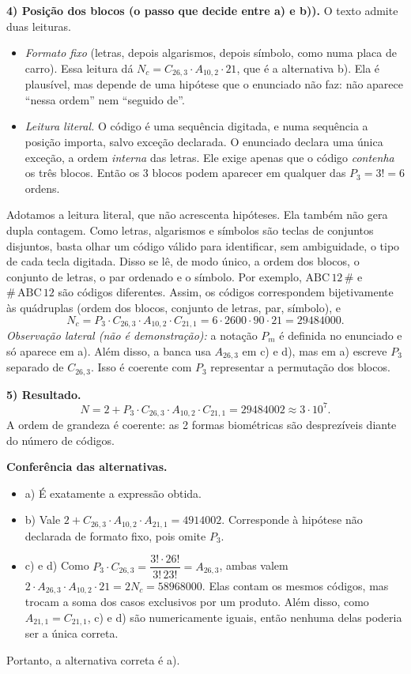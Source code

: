 \documentclass{article}%
\begin{document}
\textbf{4) Posição dos blocos (o passo que decide entre a) e b)).} O texto admite duas leituras.
\begin{itemize}
\item \emph{Formato fixo} (letras, depois algarismos, depois símbolo, como numa placa de carro). Essa leitura dá $N_c=C_{26,3}\cdot A_{10,2}\cdot 21$, que é a alternativa b). Ela é plausível, mas depende de uma hipótese que o enunciado não faz: não aparece ``nessa ordem'' nem ``seguido de''.
\item \emph{Leitura literal.} O código é uma sequência digitada, e numa sequência a posição importa, salvo exceção declarada. O enunciado declara uma única exceção, a ordem \emph{interna} das letras. Ele exige apenas que o código \emph{contenha} os três blocos. Então os 3 blocos podem aparecer em qualquer das $P_3=3!=6$ ordens.
\end{itemize}
Adotamos a leitura literal, que não acrescenta hipóteses. Ela também não gera dupla contagem. Como letras, algarismos e símbolos são teclas de conjuntos disjuntos, basta olhar um código válido para identificar, sem ambiguidade, o tipo de cada tecla digitada. Disso se lê, de modo único, a ordem dos blocos, o conjunto de letras, o par ordenado e o símbolo. Por exemplo, $\text{ABC}\,12\,\#$ e $\#\,\text{ABC}\,12$ são códigos diferentes. Assim, os códigos correspondem bijetivamente às quádruplas (ordem dos blocos, conjunto de letras, par, símbolo), e
\[
N_c=P_3\cdot C_{26,3}\cdot A_{10,2}\cdot C_{21,1}=6\cdot2600\cdot90\cdot21=29484000 .
\]
\emph{Observação lateral (não é demonstração):} a notação $P_m$ é definida no enunciado e só aparece em a). Além disso, a banca usa $A_{26,3}$ em c) e d), mas em a) escreve $P_3$ separado de $C_{26,3}$. Isso é coerente com $P_3$ representar a permutação dos blocos.

\textbf{5) Resultado.}
\[
N=2+P_3\cdot C_{26,3}\cdot A_{10,2}\cdot C_{21,1}=29484002\approx 3\cdot10^{7}.
\]
A ordem de grandeza é coerente: as 2 formas biométricas são desprezíveis diante do número de códigos.

\textbf{Conferência das alternativas.}
\begin{itemize}
\item a) É exatamente a expressão obtida.
\item b) Vale $2+C_{26,3}\cdot A_{10,2}\cdot A_{21,1}=4914002$. Corresponde à hipótese não declarada de formato fixo, pois omite $P_3$.
\item c) e d) Como $P_3\cdot C_{26,3}=\dfrac{3!\cdot 26!}{3!\,23!}=A_{26,3}$, ambas valem $2\cdot A_{26,3}\cdot A_{10,2}\cdot21=2N_c=58968000$. Elas contam os mesmos códigos, mas trocam a soma dos casos exclusivos por um produto. Além disso, como $A_{21,1}=C_{21,1}$, c) e d) são numericamente iguais, então nenhuma delas poderia ser a única correta.
\end{itemize}
Portanto, a alternativa correta é a).
\end{document}
